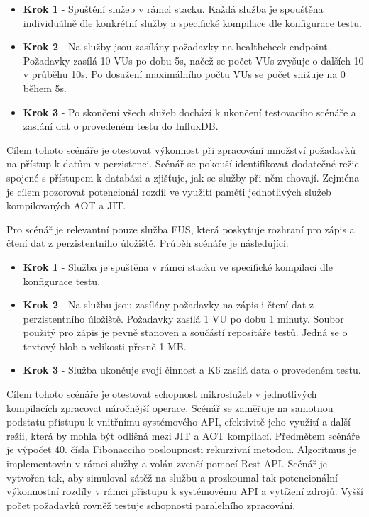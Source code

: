 \begin{itemize}
    \item \textbf{Krok 1} - Spuštění služeb v rámci stacku. Každá služba je spouštěna individuálně dle konkrétní služby a specifické kompilace dle konfigurace testu.
    \item \textbf{Krok 2} - Na služby jsou zasílány požadavky na healthcheck endpoint. Požadavky zasílá 10 VUs po dobu 5s, načež se počet VUs zvyšuje o dalších 10 v průběhu 10s. Po dosažení maximálního počtu VUs se počet snižuje na 0 během 5s.
    \item \textbf{Krok 3} - Po skončení všech služeb dochází k ukončení testovacího scénáře a zaslání dat o provedeném testu do InfluxDB.
\end{itemize}


Cílem tohoto scénáře je otestovat výkonnost při zpracování množství požadavků na přístup k datům v perzistenci. Scénář se pokouší identifikovat dodatečné režie spojené s přístupem k databázi a zjišťuje, jak se služby při něm chovají. Zejména je cílem pozorovat potencionál rozdíl ve využití paměti jednotlivých služeb kompilovaných AOT a JIT.


Pro scénář je relevantní pouze služba FUS, která poskytuje rozhraní pro zápis a čtení dat z perzistentního úložiště. Průběh scénáře je následující:

\begin{itemize}
    \item \textbf{Krok 1} - Služba je spuštěna v rámci stacku ve specifické kompilaci dle konfigurace testu.
    \item \textbf{Krok 2} - Na službu jsou zasílány požadavky na zápis i čtení dat z perzistentního úložiště. Požadavky zasílá 1 VU po dobu 1 minuty. Soubor použitý pro zápis je pevně stanoven a součástí repositáře testů. Jedná se o textový blob o velikosti přesně 1 MB.
    \item \textbf{Krok 3} - Služba ukončuje svoji činnost a K6 zasílá data o provedeném testu.
\end{itemize}


Cílem tohoto scénáře je otestovat schopnost mikroslužeb v jednotlivých kompilacích zpracovat náročnější operace. Scénář se zaměřuje na samotnou podstatu přístupu k vnitřnímu systémového API, efektivitě jeho využití a další režii, která by mohla být odlišná mezi JIT a AOT kompilací. Předmětem scénáře je výpočet 40. čísla Fibonacciho posloupnosti rekurzivní metodou. Algoritmus je implementován v rámci služby a volán zvenčí pomocí Rest API. Scénář je vytvořen tak, aby simuloval zátěž na službu a prozkoumal tak potencionální výkonnostní rozdíly v rámci přístupu k systémovému API a vytížení zdrojů. Vyšší počet požadavků rovněž testuje schopnosti paralelního zpracování.

